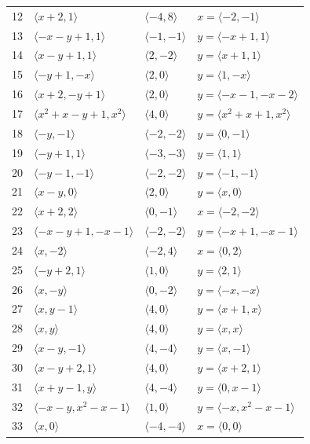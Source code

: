 \documentclass[11pt]{article}
\begin{document}
\begin{longtable}{@{}rlll@{}}
12 & $\langle x+2,1\rangle$ & $\langle -4,8\rangle$ & $x=\langle -2,-1\rangle$\\
13 & $\langle -x-y+1,1\rangle$ & $\langle -1,-1\rangle$ & $y=\langle -x+1,1\rangle$\\
14 & $\langle x-y+1,1\rangle$ & $\langle 2,-2\rangle$ & $y=\langle x+1,1\rangle$\\
15 & $\langle -y+1,-x\rangle$ & $\langle 2,0\rangle$ & $y=\langle 1,-x\rangle$\\
16 & $\langle x+2,-y+1\rangle$ & $\langle 2,0\rangle$ & $y=\langle -x-1,-x-2\rangle$\\
17 & $\langle x^{2}+x-y+1,x^{2}\rangle$ & $\langle 4,0\rangle$ & $y=\langle x^{2}+x+1,x^{2}\rangle$\\
18 & $\langle -y,-1\rangle$ & $\langle -2,-2\rangle$ & $y=\langle 0,-1\rangle$\\
19 & $\langle -y+1,1\rangle$ & $\langle -3,-3\rangle$ & $y=\langle 1,1\rangle$\\
20 & $\langle -y-1,-1\rangle$ & $\langle -2,-2\rangle$ & $y=\langle -1,-1\rangle$\\
21 & $\langle x-y,0\rangle$ & $\langle 2,0\rangle$ & $y=\langle x,0\rangle$\\
22 & $\langle x+2,2\rangle$ & $\langle 0,-1\rangle$ & $x=\langle -2,-2\rangle$\\
23 & $\langle -x-y+1,-x-1\rangle$ & $\langle -2,-2\rangle$ & $y=\langle -x+1,-x-1\rangle$\\
24 & $\langle x,-2\rangle$ & $\langle -2,4\rangle$ & $x=\langle 0,2\rangle$\\
25 & $\langle -y+2,1\rangle$ & $\langle 1,0\rangle$ & $y=\langle 2,1\rangle$\\
26 & $\langle x,-y\rangle$ & $\langle 0,-2\rangle$ & $y=\langle -x,-x\rangle$\\
27 & $\langle x,y-1\rangle$ & $\langle 4,0\rangle$ & $y=\langle x+1,x\rangle$\\
28 & $\langle x,y\rangle$ & $\langle 4,0\rangle$ & $y=\langle x,x\rangle$\\
29 & $\langle x-y,-1\rangle$ & $\langle 4,-4\rangle$ & $y=\langle x,-1\rangle$\\
30 & $\langle x-y+2,1\rangle$ & $\langle 4,0\rangle$ & $y=\langle x+2,1\rangle$\\
31 & $\langle x+y-1,y\rangle$ & $\langle 4,-4\rangle$ & $y=\langle 0,x-1\rangle$\\
32 & $\langle -x-y,x^{2}-x-1\rangle$ & $\langle 1,0\rangle$ & $y=\langle -x,x^{2}-x-1\rangle$\\
33 & $\langle x,0\rangle$ & $\langle -4,-4\rangle$ & $x=\langle 0,0\rangle$\\

\end{longtable}
\end{document}

